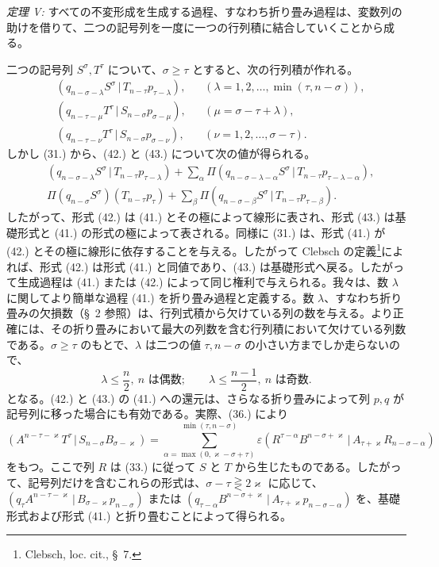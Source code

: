 \documentclass[11pt]{jlreq}
\newcommand{\pair}[2]{(#1\,|\,#2)}
\newcommand{\eps}{\varepsilon}
\begin{document}
\emph{定理 V:} すべての不変形成を生成する過程、すなわち折り畳み過程は、変数列の助けを借りて、二つの記号列を一度に一つの行列積に結合していくことから成る。

二つの記号列 $S^\sigma,T^\tau$ について、$\sigma\ge\tau$ とすると、次の行列積が作れる。
\begin{align}
&\pair{q_{n-\sigma-\lambda}S^\sigma}{T_{n-\tau}p_{\tau-\lambda}}, &&(\lambda=1,2,\ldots,\min(\tau,n-\sigma)),\tag{41}\\
&\pair{q_{n-\tau-\mu}T^\tau}{S_{n-\sigma}p_{\sigma-\mu}}, &&(\mu=\sigma-\tau+\lambda),\tag{42}\\
&\pair{q_{n-\tau-\nu}T^\tau}{S_{n-\sigma}p_{\sigma-\nu}}, &&(\nu=1,2,\ldots,\sigma-\tau).
\tag{43}
\end{align}
しかし (31.) から、(42.) と (43.) について次の値が得られる。
\begin{align}
&\pair{q_{n-\sigma-\lambda}S^\sigma}{T_{n-\tau}p_{\tau-\lambda}}
 +\sum_{\alpha}\Pi\pair{q_{n-\sigma-\lambda-\alpha}S^\sigma}{T_{n-\tau}p_{\tau-\lambda-\alpha}},\tag{42a}\\
&\Pi(q_{n-\sigma}S^\sigma)(T_{n-\tau}p_\tau)
 +\sum_{\beta}\Pi\pair{q_{n-\sigma-\beta}S^\sigma}{T_{n-\tau}p_{\tau-\beta}}.
\tag{43a}
\end{align}
したがって、形式 (42.) は (41.) とその極によって線形に表され、形式 (43.) は基礎形式と (41.) の形式の極によって表される。同様に (31.) は、形式 (41.) が (42.) とその極に線形に依存することを与える。したがって Clebsch の定義\footnote{Clebsch, loc. cit., \S\ 7.}によれば、形式 (42.) は形式 (41.) と同値であり、(43.) は基礎形式へ戻る。したがって生成過程は (41.) または (42.) によって同じ権利で与えられる。我々は、数 $\lambda$ に関してより簡単な過程 (41.) を折り畳み過程と定義する。数 $\lambda$、すなわち折り畳みの欠損数（\S\ 2 参照）は、行列式積から欠けている列の数を与える。より正確には、その折り畳みにおいて最大の列数を含む行列積において欠けている列数である。$\sigma\ge\tau$ のもとで、$\lambda$ は二つの値 $\tau,n-\sigma$ の小さい方までしか走らないので、
\begin{equation}
 \lambda\le\frac n2,\ n\text{ は偶数};\qquad
 \lambda\le\frac{n-1}{2},\ n\text{ は奇数}.
\tag{44}
\end{equation}
となる。(42.) と (43.) の (41.) への還元は、さらなる折り畳みによって列 $p,q$ が記号列に移った場合にも有効である。実際、(36.) により
\[
 \pair{A^{n-\tau-\varkappa}T^\tau}{S_{n-\sigma}B_{\sigma-\varkappa}}
 =\sum_{\alpha=\max(0,\varkappa-\sigma+\tau)}^{\min(\tau,n-\sigma)}
 \eps\pair{R^{\tau-\alpha}B^{n-\sigma+\varkappa}}{A_{\tau+\varkappa}R_{n-\sigma-\alpha}}
\]
をもつ。ここで列 $R$ は (33.) に従って $S$ と $T$ から生じたものである。したがって、記号列だけを含むこれらの形式は、$\sigma-\tau\gtreqless 2\varkappa$ に応じて、$\pair{q_\tau A^{n-\tau-\varkappa}}{B_{\sigma-\varkappa}p_{n-\sigma}}$ または $\pair{q_{\tau-\alpha}B^{n-\sigma+\varkappa}}{A_{\tau+\varkappa}p_{n-\sigma-\alpha}}$ を、基礎形式および形式 (41.) と折り畳むことによって得られる。
\end{document}
